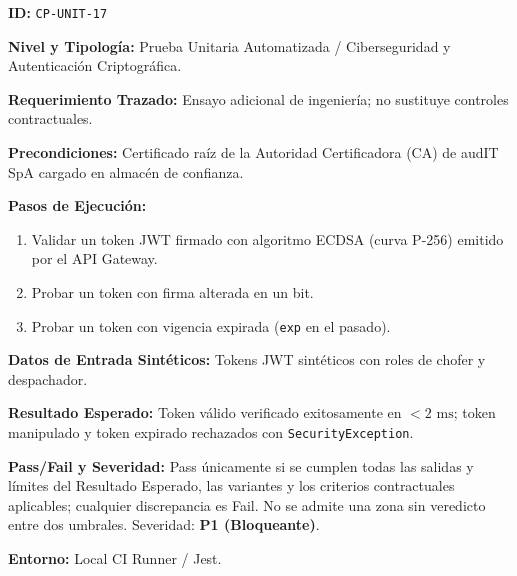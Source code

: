 \par\noindent\textbf{ID:} \texttt{C\allowbreak{}P\allowbreak{}-\allowbreak{}U\allowbreak{}N\allowbreak{}I\allowbreak{}T\allowbreak{}-\allowbreak{}1\allowbreak{}7\allowbreak{}}\par
\par\noindent\textbf{Nivel y Tipología:} Prueba Unitaria Automatizada / Ciberseguridad y Autenticación Criptográfica.\par
\par\noindent\textbf{Requerimiento Trazado:} Ensayo adicional de ingeniería; no sustituye controles contractuales.\par
\par\noindent\textbf{Precondiciones:} Certificado raíz de la Autoridad Certificadora (CA) de audIT SpA cargado en almacén de confianza.\par
\par\noindent\textbf{Pasos de Ejecución:} \par
\begin{enumerate}
\item Validar un token JWT firmado con algoritmo ECDSA (curva P-256) emitido por el API Gateway.
\item Probar un token con firma alterada en un bit.
\item Probar un token con vigencia expirada (\texttt{e\allowbreak{}x\allowbreak{}p\allowbreak{}} en el pasado).
\end{enumerate}
\par\noindent\textbf{Datos de Entrada Sintéticos:} Tokens JWT sintéticos con roles de chofer y despachador.\par
\par\noindent\textbf{Resultado Esperado:} Token válido verificado exitosamente en \(< 2\text{ ms}\); token manipulado y token expirado rechazados con \texttt{S\allowbreak{}e\allowbreak{}c\allowbreak{}u\allowbreak{}r\allowbreak{}i\allowbreak{}t\allowbreak{}y\allowbreak{}E\allowbreak{}x\allowbreak{}c\allowbreak{}e\allowbreak{}p\allowbreak{}t\allowbreak{}i\allowbreak{}o\allowbreak{}n\allowbreak{}}.\par
\par\noindent\textbf{Pass/Fail y Severidad:} Pass únicamente si se cumplen todas las salidas y límites del Resultado Esperado, las variantes y los criterios contractuales aplicables; cualquier discrepancia es Fail. No se admite una zona sin veredicto entre dos umbrales. Severidad: \textbf{P1 (Bloqueante)}.\par
\par\noindent\textbf{Entorno:} Local CI Runner / Jest.\par







